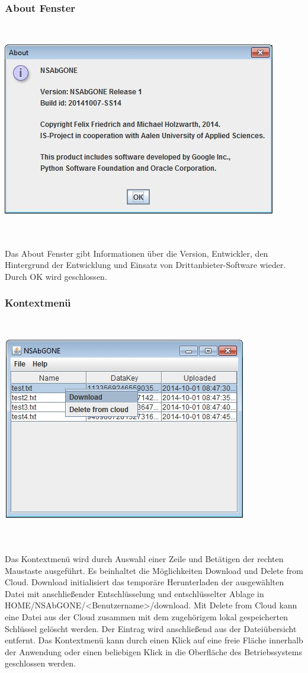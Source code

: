 \documentclass[13pt,a4paper,bibliography=totocnumbered,listof=totocnumbered]{scrartcl}
\begin{document}
\subsubsection{About Fenster}
$\;$\\
\begin{minipage}{\linewidth}
	\centering
	\includegraphics[width=0.4\linewidth]{./img/AboutPopUp.jpg}
	\label{AboutPopUp}
\end{minipage}
\\\\Das About Fenster gibt Informationen über die Version, Entwickler, den Hintergrund der Entwicklung und Einsatz von Drittanbieter-Software wieder. Durch OK wird geschlossen.

\subsubsection{Kontextmenü}
$\;$\\
\begin{minipage}{\linewidth}
	\centering
	\includegraphics[width=0.4\linewidth]{./img/Kontext.jpg}
	\label{Kontext}
\end{minipage}
\\\\Das Kontextmenü wird durch Auswahl einer Zeile und Betätigen der rechten Maustaste ausgeführt. Es beinhaltet die Möglichkeiten Download und Delete from Cloud. Download initialisiert das temporäre Herunterladen der ausgewählten Datei mit anschließender Entschlüsselung und entschlüsselter Ablage in HOME/NSAbGONE/\textless Benutzername\textgreater/download. Mit Delete from Cloud kann eine Datei aus der Cloud zusammen mit dem zugehörigem lokal gespeicherten Schlüssel gelöscht werden. Der Eintrag wird anschließend aus der Dateiübersicht entfernt. Das Kontextmenü kann durch einen Klick auf eine freie Fläche innerhalb der Anwendung oder einen beliebigen Klick in die Oberfläche des Betriebssystems geschlossen werden.
\end{document}

